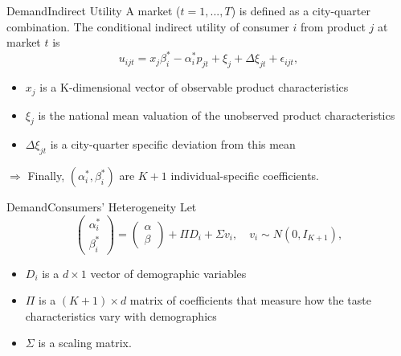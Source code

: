 \documentclass{beamer}
\begin{document}
\begin{frame}{Demand}{Indirect Utility}
	A market ($t=1,...,T$) is defined as a city-quarter combination. The conditional indirect utility of consumer $i$ from product $j$ at market $t$ is
	\begin{equation}
		u_{ijt}=x_j\beta_i^*-\alpha_i^*p_{jt}+\xi_j+\Delta\xi_{jt}+\epsilon_{ijt},
	\end{equation}

	\begin{itemize}
		\item $x_j$ is a K-dimensional vector of observable product characteristics
		\item $\xi_j$ is the national mean valuation of the unobserved product characteristics
		\item $\Delta\xi_{jt}$ is a city-quarter specific deviation from this mean
	\end{itemize}
	\medskip
	$\Rightarrow$ Finally, $(\alpha_i^*,\beta_i^*)$ are $K+1$ individual-specific coefficients.
\end{frame}
\begin{frame}{Demand}{Consumers' Heterogeneity}
	Let
	\begin{equation}
		\begin{pmatrix}
			\alpha_i^*\\ \beta_i^*
		\end{pmatrix}
		=
		\begin{pmatrix}
			\alpha \\ \beta
		\end{pmatrix}
		+\Pi D_i +\Sigma v_i,\quad v_i\sim N(0,I_{K+1}),
	\end{equation}
	\begin{itemize}
		\item $D_i$ is a $d\times 1$ vector of demographic variables
		\item $\Pi$ is a $(K+1)\times d$ matrix of coefficients that measure how the taste characteristics vary with demographics
		\item $\Sigma$ is a scaling matrix.
	\end{itemize}
\end{frame}
\end{document}
